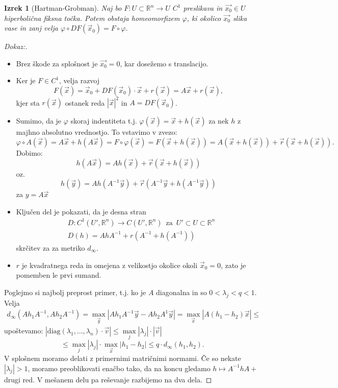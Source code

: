 \documentclass{article}
\newtheorem{izrek}{Izrek}
\newcommand{\R}{\mathbb{R}}
\begin{document}
\begin{izrek}[Hartman-Grobman]
Naj bo $F: U\subset \R^n \rightarrow U$ $C^1$ preslikava in $\vec{x_0} \in U$ 
hiperbolična fiksna točka. Potem obstaja homeomorfizem $\varphi$, ki 
okolico $\vec{x_0}$ slika vase in zanj velja $\varphi \circ DF(\vec{x}_0) = F \circ \varphi$.
\end{izrek}

\begin{proof}[Dokaz:]
    \hfill
\begin{itemize}
    \item Brez škode za splošnost je $\vec{x_0} = 0$, kar dosežemo s translacijo. 
    \item Ker je $F \in C^1$, velja razvoj 
    $$ 
    F(\vec{x}) = \vec{x}_0 + DF(\vec{x}_0)\cdot \vec{x} + r(\vec{x}) 
    = A\vec{x} + r(\vec{x}),
    $$
    kjer sta $r(\vec{x})$ ostanek reda $|\vec{x}|^2$ in $A = DF(\vec{x}_0)$.
    \item Sumimo, da je $\varphi$ skoraj indentiteta t.j. $\varphi(\vec{x}) = \vec{x} + h(\vec{x})$ 
    za nek $h$ z majhno absolutno vrednostjo. To vstavimo v zvezo: 
    $$\varphi \circ A(\vec{x}) = A\vec{x} + h(A\vec{x}) = F\circ \varphi(\vec{x}) = F(\vec{x} + h(\vec{x})) = A(\vec{x} + h(\vec{x})) + \vec{r}(\vec{x} + h(\vec{x})).$$
    Dobimo: $$ h(A\vec{x}) = Ah(\vec{x}) + \vec{r}(\vec{x} + h(\vec{x})) $$ oz. 
    $$ h(\vec{y}) = Ah(A^{-1} \vec{y}) + \vec{r}(A^{-1} \vec{y} + h(A^{-1} \vec{y})) $$ za $y = A\vec{x}$
    \item Ključen del je pokazati, da je desna stran 
    \begin{align*}
        &D: C^1(U', \R^n) \rightarrow C(U', \R^n) \,\text{ za }\, U' \subset U \subset \R^n\\
        &D(h) = AhA^{-1} + r(A^{-1} + h(A^{-1}))
    \end{align*}
    skrčitev za za metriko $d_\infty$.    
    \item $r$ je kvadratnega reda in omejena z velikostjo okolice 
    okoli $\vec{x}_0 = 0$, zato je pomemben le prvi sumand.
\end{itemize}
Poglejmo si najbolj preprost primer, t.j. ko je $A$ diagonalna in so 
$0 < \lambda_j < q < 1$. Velja 
\begin{align*}
d_\infty(Ah_1 A^{-1}, A h_2 A^{-1}) = \max\limits_{\vec{y}} |Ah_1 A^{-1} \vec{y} - Ah_2 A^{1} \vec{y}| = 
\max\limits_{\vec{x}} |A(h_1 - h_2)\vec{x}| \leq 
\end{align*}
upoštevamo: $|\text{diag}(\lambda_1, \dots, \lambda_n) \cdot \vec{v}| \leq \max\limits_{j} |\lambda_j| \cdot |\vec{v}|$
$$
\leq \max\limits_{j} |\lambda_j| \cdot \max\limits_{\vec{x}} |h_1 - h_2| \leq q\cdot d_\infty(h_1, h_2).
$$
V splošnem moramo delati z primernimi matričnimi normami. Če so nekate $|\lambda_j| > 1$, 
moramo preoblikovati enačbo tako, da na koncu gledamo $h\mapsto A^{-1} h A + $ drugi red.
V mešanem delu pa reševanje razbijemo na dva dela.
\end{proof}
\end{document}
